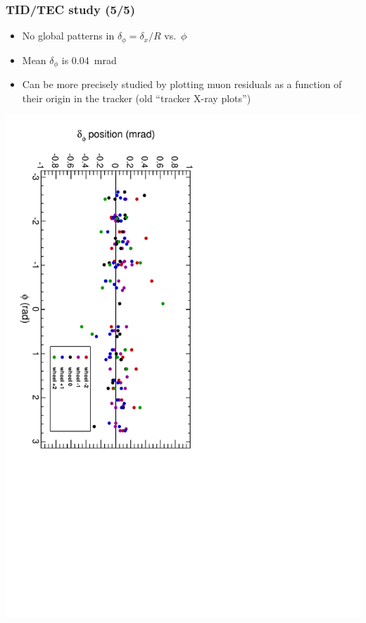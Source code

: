 \documentclass[compress]{beamer}
\begin{document}
\begin{frame}
\frametitle{TID/TEC study (5/5)}
\begin{itemize}
\item No global patterns in $\delta_\phi = \delta_x/R$ vs.\ $\phi$
\item Mean $\delta_\phi$ is 0.04~mrad
\item Can be more precisely studied by plotting muon residuals as a
  function of their origin in the tracker (old ``tracker X-ray plots'')
\end{itemize}

\includegraphics[height=\linewidth, angle=90]{tecphi.pdf}
\end{frame}
\end{document}
